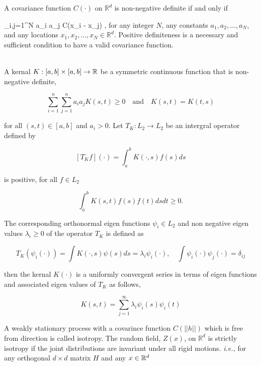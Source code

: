 A covariance function $C(\cdot)$ on $\mathbb{R}^d$ is non-negative definite  if and only if 

\beq \label{cov_pd}
\sum_{i,j=1}^{N} a_i a_j C(x_i - x_j) ,
\eeq
for any integer $N$, any constants $a_1, a_2, \ldots, a_N$, and any locations $x_1, x_2, \ldots, x_N \in \mathbb{R}^d$. Positive definiteness is a necessary and sufficient condition to have a valid covariance function. 

		\begin{thm} \label{mercer}  \hfill \\
			
			A kernal $K:[a,b]\times [a,b] \to \mathbb{R}$ be a symmetric continuous function that is non-negative definite,
			
			\[
				\sum_{i=1}^{n}\sum_{j=1}^{n} a_i a_j K(s, t) \ge 0 \quad \mbox{and} \quad K(s,t) = K(t,s)
			\]
			
			for all $(s,t)\in [a,b]$ and $a_i>0$. Let $T_K:L_2 \to L_2$ be an intergral operator defined by
			
			\[
				[T_Kf](\cdot) = \int_{a}^{b} K(\cdot,s)f(s)ds
			\]
			
			is positive, for all $f\in L_2$
			
			\[
				\int_{a}^{b} K(s, t)f(s)f(t)dsdt \ge 0.
			\]
			
			The corresponding orthonormal eigen functions $\psi_i\in L_2$ and non negative eigen values $\lambda_i \ge 0$ of the operator $T_K$ is defined as
			
			\[
				T_K(\psi_i(\cdot)) = \int K(\cdot, s)\psi(s)ds = \lambda_i\psi_i(\cdot), \quad \int \psi_i(\cdot)\psi_j(\cdot) = \delta_{ij}
			\]
			
			
			then the kernal $K(\cdot)$ is a uniformly convergent series in terms of eigen functions and associated eigen values of $T_K$ as follows,
			
			\[
				K(s,t) = \sum_{j=1}^{\infty} \lambda_i \psi_i(s)\psi_i(t) 
			\]
			
		\end{thm}

A weakly stationary process with a covarince function $C(||h||)$ which is free from direction is called isotropy. The random field, $Z(x)$, on $\mathbb{R}^d$ is strictly isotropy if the joint distributions are invariant under all rigid motions. {\em i.e.,} for any orthogonal $d\times d$ matrix $H$ and any $x\in \mathbb{R}^d$

